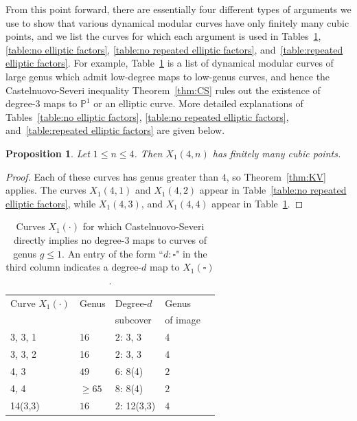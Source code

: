 \documentclass[12pt]{amsart}
\newtheorem{prop}[thm]{Proposition}
\theoremstyle{definition}
\newcommand{\bbP}{\mathbb{P}}
\numberwithin{equation}{section}
\begin{document}
From this point forward, there are essentially four different types of arguments we use to show that various dynamical modular curves have only finitely many cubic points, and we list the curves for which each argument is used in Tables~\ref{table:no degree 3 maps to elliptic curves}, \ref{table:no elliptic factors}, \ref{table:no repeated elliptic factors}, and~\ref{table:repeated elliptic factors}. For example, Table~\ref{table:no degree 3 maps to elliptic curves} is a list of dynamical modular curves of large genus which admit low-degree maps to low-genus curves, and hence the Castelnuovo-Severi inequality Theorem~\ref{thm:CS} rules out the existence of degree-$3$ maps to $\bbP^1$ or an elliptic curve. More detailed explanations of Tables~\ref{table:no elliptic factors}, \ref{table:no repeated elliptic factors}, and~\ref{table:repeated elliptic factors} are given below.

\begin{prop}\label{prop:X1(m,4)}
    Let $1 \le n \le 4$. Then $X_1(4,n)$ has finitely many cubic points.
\end{prop}

\begin{proof}
Each of these curves has genus greater than $4$, so Theorem~\ref{thm:KV} applies. The curves $X_1(4,1)$ and $X_1(4,2)$ appear in Table~\ref{table:no repeated elliptic factors}, while $X_1(4,3)$, and $X_1(4,4)$ appear in Table~\ref{table:no degree 3 maps to elliptic curves}.
\end{proof}

\begin{table}
\centering
\begin{tabular}{|l|l|l|l|l|}
 \hline
 Curve $X_1(\cdot)$ & Genus & Degree-$d$ & Genus \\
  & & subcover & of image \\
 \hline \hline
 3, 3, 1 & 16 & $2$: 3, 3 & 4 \\
 \hline
 3, 3, 2 & 16 & $2$: 3, 3 & 4 \\
 \hline
 4, 3 & $49$ & $6$: 8(4) & $2$\\
 \hline
 4, 4 & $\ge 65$ & $8$: 8(4) & $2$\\
 \hline\hline
 14(3,3) & $16$ & $2$: 12(3,3) & $4$\\
 \hline
\end{tabular}
\caption{Curves $X_1(\cdot)$ for which Castelnuovo-Severi directly implies no degree-$3$ maps to curves of genus $g\leq 1$. An entry of the form ``$d: \square$" in the third column indicates a degree-$d$ map to $X_1(\square)$.}
\label{table:no degree 3 maps to elliptic curves}
\end{table}
\end{document}
